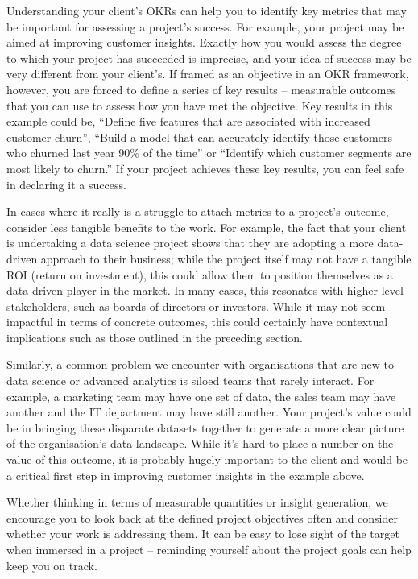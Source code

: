 \documentclass[
]{book}
\begin{document}
Understanding your client's OKRs can help you to identify key metrics that may be important for assessing a project's success. For example, your project may be aimed at improving customer insights. Exactly how you would assess the degree to which your project has succeeded is imprecise, and your idea of success may be very different from your client's. If framed as an objective in an OKR framework, however, you are forced to define a series of key results -- measurable outcomes that you can use to assess how you have met the objective. Key results in this example could be, ``Define five features that are associated with increased customer churn'', ``Build a model that can accurately identify those customers who churned last year 90\% of the time'' or ``Identify which customer segments are most likely to churn.'' If your project achieves these key results, you can feel safe in declaring it a success.

In cases where it really is a struggle to attach metrics to a project's outcome, consider less tangible benefits to the work. For example, the fact that your client is undertaking a data science project shows that they are adopting a more data-driven approach to their business; while the project itself may not have a tangible ROI (return on investment), this could allow them to position themselves as a data-driven player in the market. In many cases, this resonates with higher-level stakeholders, such as boards of directors or investors. While it may not seem impactful in terms of concrete outcomes, this could certainly have contextual implications such as those outlined in the preceding section.

Similarly, a common problem we encounter with organisations that are new to data science or advanced analytics is siloed teams that rarely interact. For example, a marketing team may have one set of data, the sales team may have another and the IT department may have still another. Your project's value could be in bringing these disparate datasets together to generate a more clear picture of the organisation's data landscape. While it's hard to place a number on the value of this outcome, it is probably hugely important to the client and would be a critical first step in improving customer insights in the example above.

Whether thinking in terms of measurable quantities or insight generation, we encourage you to look back at the defined project objectives often and consider whether your work is addressing them. It can be easy to lose sight of the target when immersed in a project -- reminding yourself about the project goals can help keep you on track.
\end{document}
